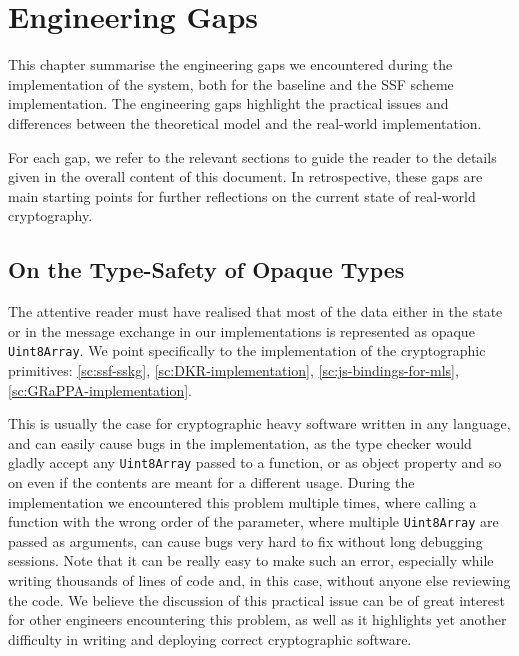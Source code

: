 \chapter{Engineering Gaps}\label{ch:gaps}

This chapter summarise the engineering gaps
we encountered during the implementation of the system,
both for the baseline and the SSF scheme implementation.
The engineering gaps highlight the practical issues
and differences between the theoretical model and 
the real-world implementation.

For each gap, we refer to the relevant sections to guide the reader
to the details given in the overall content of this document.
In retrospective, these gaps are main starting
points for further reflections on the current
state of real-world cryptography.



\section{On the Type-Safety of Opaque Types}\label{sc:gap-type-safety-of-opaque-byte-arrays}
The attentive reader must have realised that most of the data either in the state
or in the message exchange in our implementations is represented as opaque \texttt{Uint8Array}.
We point specifically to the implementation of the cryptographic primitives:
\cref{sc:ssf-sskg}, \cref{sc:DKR-implementation}, \cref{sc:js-bindings-for-mls}, \cref{sc:GRaPPA-implementation}.

This is usually the case for cryptographic heavy software written in any language, 
and can easily cause bugs in the implementation, as the type checker
would gladly accept any \texttt{Uint8Array} passed to a function, or as object 
property and so on even if the contents are meant for a different usage. 
During the implementation we encountered this problem multiple times,
where calling a function with the wrong order of the parameter, where
multiple \texttt{Uint8Array} are passed as arguments, can cause bugs
very hard to fix without long debugging sessions. Note that it can be
really easy to make such an error, especially while writing thousands
of lines of code and, in this case, without anyone else reviewing the code.
We believe the discussion of this practical issue can be of great interest for other
engineers encountering this problem, as well as it highlights yet another
difficulty in writing and deploying correct cryptographic software.

